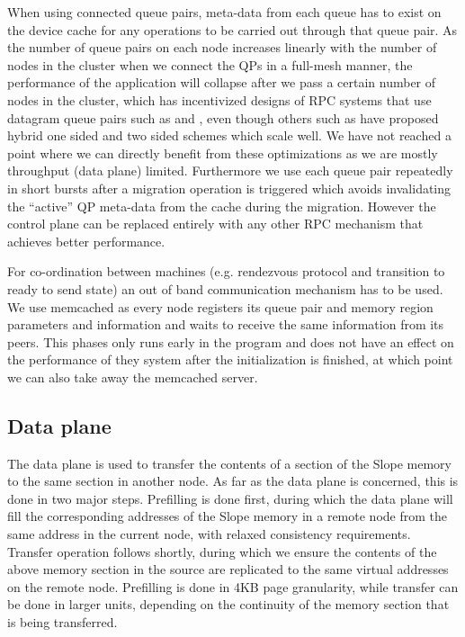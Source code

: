 When using connected queue pairs, meta-data
from each queue has to exist on the device cache for any operations to be
carried out through that queue pair. As the number of queue pairs on each node
increases linearly with the number of nodes in the cluster when we connect the
QPs in a full-mesh manner, the performance of the application will collapse
after we pass a certain number of nodes in the cluster, which has
incentivized designs of RPC systems that use datagram queue pairs such as
\cite{kalia2019datacenter} and \cite{kalia2016fasst}, even though others such
as \cite{novakovic2019storm} have proposed hybrid one sided and two sided
schemes which scale well. We have not reached a point where we can directly
benefit from these optimizations as we are mostly throughput (data plane)
limited. Furthermore we use each queue pair repeatedly in short bursts after a
migration operation is triggered which avoids invalidating the ``active'' QP
meta-data from the cache during the migration. However the control plane
can be replaced entirely with any other RPC mechanism that achieves better
performance.

For co-ordination between machines (e.g. rendezvous protocol and transition
to ready to send state)
an out of band communication mechanism has to be used. We use memcached as
every node registers its queue pair and memory region parameters and
information and waits to receive the same information from its peers. This
phases only runs early in the program and does not have an effect on the
performance of they system after the initialization is finished, at which point
we can also take away the memcached server.

\subsection{Data plane}
The data plane is used to transfer the contents of a section of the Slope
memory to the same section in another node. As far as the data plane is
concerned, this is done in two major steps. Prefilling is done first, during
which the data plane will fill the corresponding addresses of the
Slope memory in a remote node from the same address in the current node, with
relaxed consistency requirements. Transfer operation follows shortly, during
which we ensure the contents of the above memory section in the source are
replicated to the same virtual addresses on the remote node. Prefilling is done
in 4KB page granularity, while transfer can be done in larger units, depending
on the continuity of the memory section that is being transferred.


